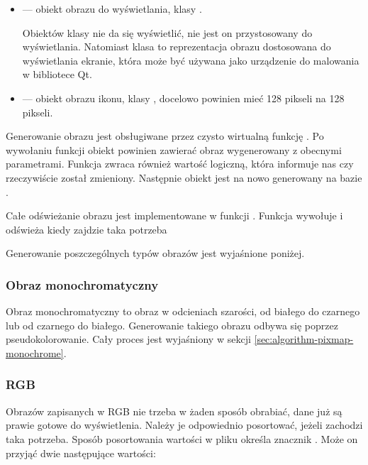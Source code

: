 \begin{itemize}
    \item {} --- obiekt obrazu do wyświetlania, klasy .

          Obiektów klasy  nie da się wyświetlić, nie jest on przystosowany do wyświetlania.
          Natomiast klasa  to reprezentacja obrazu dostosowana do wyświetlania ekranie, która może być używana jako urządzenie do malowania w bibliotece Qt.

    \item {} --- obiekt obrazu ikonu, klasy , docelowo powinien mieć 128 pikseli na 128 pikseli.

\end{itemize}

Generowanie obrazu jest obsługiwane przez czysto wirtualną funkcję .
Po wywołaniu funkcji obiekt  powinien zawierać obraz wygenerowany z obecnymi parametrami.
Funkcja zwraca również wartość logiczną, która informuje nas czy  rzeczywiście został zmieniony.
Następnie obiekt  jest na nowo generowany na bazie .

Całe odświeżanie obrazu jest implementowane w funkcji .
Funkcja wywołuje  i odświeża  kiedy zajdzie taka potrzeba

Generowanie poszczególnych typów obrazów jest wyjaśnione poniżej.


\subsubsection{Obraz monochromatyczny}
\par
Obraz monochromatyczny to obraz w odcieniach szarości, od białego do czarnego lub od czarnego do białego.
Generowanie takiego obrazu odbywa się poprzez pseudokolorowanie.
Cały proces jest wyjaśniony w sekcji \ref{sec:algorithm-pixmap-monochrome}.

\subsubsection{RGB}
Obrazów zapisanych w RGB nie trzeba w żaden sposób obrabiać, dane już są prawie gotowe do wyświetlenia.
Należy je odpowiednio posortować, jeżeli zachodzi taka potrzeba.
Sposób posortowania wartości w pliku określa znacznik .
Może on przyjąć dwie następujące wartości:

